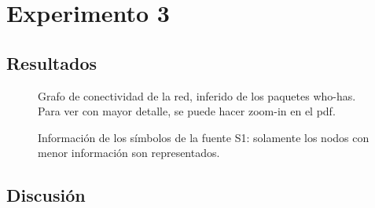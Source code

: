 
\section{Experimento 3}

\subsection{Resultados}

\begin{figure}[H]
  \centering
  \caption{\normalfont }
\end{figure}

\begin{figure}[H]
  \centering
  \caption{  \normalfont Grafo de conectividad de la red, inferido de los paquetes who-has. Para ver con mayor detalle, se puede hacer zoom-in en el pdf. }
\end{figure}

\begin{figure}[H]
  \centering
  \caption{ \normalfont Información de los símbolos de la fuente S1: solamente los nodos con menor información son representados.}
\end{figure}

\subsection{Discusión}

